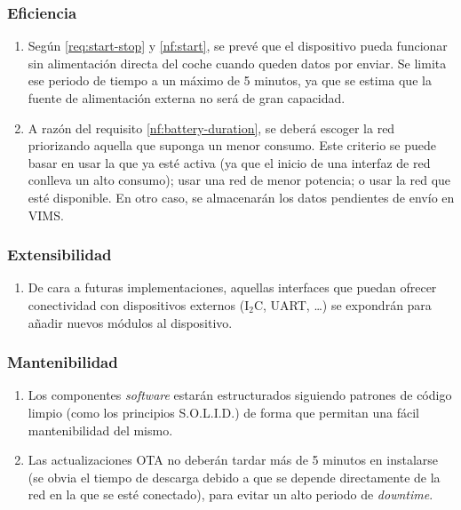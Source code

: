 \subsubsection{Eficiencia}
\begin{enumerate}[resume, label=\textbf{\texttt{RNF-\arabic*}}]
  \item\label{nf:battery-duration} Según \ref{req:start-stop} y \ref{nf:start},
  se prevé que el dispositivo pueda funcionar sin alimentación directa del coche
  cuando queden datos por enviar. Se limita ese periodo de tiempo a un máximo de
  5 minutos, ya que se estima que la fuente de alimentación externa no será de
  gran capacidad.
  \item\label{nf:network-election} A razón del requisito \ref{nf:battery-duration},
  se deberá escoger la red priorizando aquella que suponga un menor consumo. Este
  criterio se puede basar en usar la que ya esté activa (ya que el inicio de una
  interfaz de red conlleva un alto consumo); usar una red de menor potencia; o
  usar la red que esté disponible. En otro caso, se almacenarán los datos pendientes
  de envío en \ac{VIMS}.
\end{enumerate}

\subsubsection{Extensibilidad}
\begin{enumerate}[resume, label=\textbf{\texttt{RNF-\arabic*}}]
  \item\label{nf:components} De cara a futuras implementaciones, aquellas interfaces
  que puedan ofrecer conectividad con dispositivos externos (I$_2$C, UART, \dots)
  se expondrán para añadir nuevos módulos al dispositivo.
\end{enumerate}

\subsubsection{Mantenibilidad}
\begin{enumerate}[resume, label=\textbf{\texttt{RNF-\arabic*}}]
  \item\label{nf:solid} Los componentes \textit{software} estarán estructurados
  siguiendo patrones de código limpio (como los principios S.O.L.I.D.) de forma
  que permitan una fácil mantenibilidad del mismo.
  \item\label{nf:ota-time} Las actualizaciones OTA no deberán tardar más de 
  5 minutos en instalarse (se obvia el tiempo de descarga debido a que se depende
  directamente de la red en la que se esté conectado), para evitar un alto periodo
  de \textit{downtime}.
\end{enumerate}

